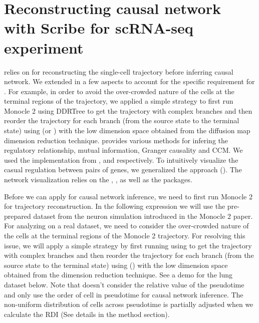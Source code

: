 \documentclass[10pt,oneside]{article}\usepackage[]{graphicx}\usepackage[]{color}
\begin{document}
\section{Reconstructing causal network with Scribe for scRNA-seq experiment}
 relies on  for reconstructing the single-cell trajectory before inferring causal network. We extended  in a few aspects to account for the specific requirement for . For example, in order to avoid the over-crowded nature of the cells at the terminal regions of the trajectory, we applied a simple strategy to first run Monocle 2 using DDRTree to get the trajectory with complex branches and then reorder the trajectory for each branch (from the source state to the terminal state) using  (or ) with the low dimension space obtained from the diffusion map dimension reduction technique.  provides various methods for infering the regulatory relationship, mutual information, Granger causality and CCM. We used the implementation from ,  and  respectively. To intuitively visualize the casual regulation between pairs of genes, we generalized the  approach (\cite{}). The network visualization relies on the , ,  as well as the  packages. 

Before we can apply  for causal network inference, we need to first run Monocle 2 for trajectory reconstruction. In the following expression we will use the pre-prepared dataset from the neuron simulation introduced in the Monocle 2 paper. For analyzing on a real dataset, we need to consider the over-crowded nature of the cells at the terminal regions of the Monocle 2 trajectory. For resolving this issue, we will apply a simple strategy by first running  using  to get the trajectory with complex branches and then reorder the trajectory for each branch (from the source state to the terminal state) using  () with the low dimension space obtained from the  dimension reduction technique. See a demo for the lung dataset below. Note that  doesn't consider the relative value of the pseudotime and only use the order of cell in pseudotime for causal network inference. The non-uniform distribution of cells across pseudotime is partially adjusted when we calculate the RDI (See details in the method section).   
\end{document}
